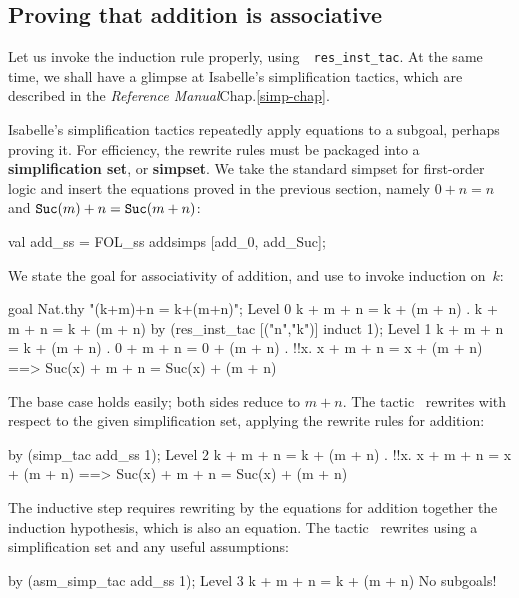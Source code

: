 \subsection{Proving that addition is associative}
Let us invoke the induction rule properly, using~{\tt
  res_inst_tac}.  At the same time, we shall have a glimpse at Isabelle's
simplification tactics, which are described in 
%
    {the {\em Reference Manual}}{Chap.\ts\ref{simp-chap}}.


Isabelle's simplification tactics repeatedly apply equations to a subgoal,
perhaps proving it.  For efficiency, the rewrite rules must be
packaged into a {\bf simplification set}, 
or {\bf simpset}.  We take the standard simpset for first-order logic and
insert the equations proved in the previous section, namely
$0+n=n$ and ${\tt Suc}(m)+n={\tt Suc}(m+n)$:
\begin{ttbox}
val add_ss = FOL_ss addsimps [add_0, add_Suc];
\end{ttbox}
We state the goal for associativity of addition, and
use  to invoke induction on~$k$:
\begin{ttbox}
goal Nat.thy "(k+m)+n = k+(m+n)";
{\out Level 0}
{\out k + m + n = k + (m + n)}
{. k + m + n = k + (m + n)}
\ttbreak
by (res_inst_tac [("n","k")] induct 1);
{\out Level 1}
{\out k + m + n = k + (m + n)}
{. 0 + m + n = 0 + (m + n)}
{. !!x. x + m + n = x + (m + n) ==>}
{\out          Suc(x) + m + n = Suc(x) + (m + n)}
\end{ttbox}
The base case holds easily; both sides reduce to $m+n$.  The
tactic~ rewrites with respect to the given simplification
set, applying the rewrite rules for addition:
\begin{ttbox}
by (simp_tac add_ss 1);
{\out Level 2}
{\out k + m + n = k + (m + n)}
{. !!x. x + m + n = x + (m + n) ==>}
{\out          Suc(x) + m + n = Suc(x) + (m + n)}
\end{ttbox}
The inductive step requires rewriting by the equations for addition
together the induction hypothesis, which is also an equation.  The
tactic~ rewrites using a simplification set and any
useful assumptions:
\begin{ttbox}
by (asm_simp_tac add_ss 1);
{\out Level 3}
{\out k + m + n = k + (m + n)}
{\out No subgoals!}
\end{ttbox}


